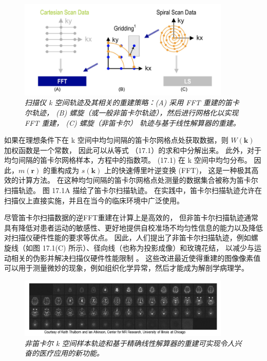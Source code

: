 \begin{figure}[H]
	\centering
	\includegraphics[width=0.9\textwidth]{figs/F17.1.png}
	\caption{\textit{扫描仪 k 空间轨迹及其相关的重建策略：(A) 采用 FFT 重建的笛卡尔轨迹，
	(B) 螺旋（或一般非笛卡尔轨迹），然后进行网格化以实现 FFT 重建，
	(C) 螺旋（非笛卡尔） 轨迹与基于线性解算器的重建。}}
\end{figure}

如果在理想条件下在 k 空间中均匀间隔的笛卡尔网格点处获取数据，则 $W(\mathbf{k})$ 加权函数是一个常数，
因此可以从等式 （17.1）的求和中分解出来。 此外，对于均匀间隔的笛卡尔网格样本，方程中的指数项。 
(17.1) 在 k 空间中均匀分布。 因此，$m(\mathbf{r})$ 的重构成为 $s(\mathbf{k})$ 上的快速傅里叶逆变换 (FFT)，
这是一种极其高效的计算方法。 在这种均匀间隔的笛卡尔网格点处测量的数据集合被称为笛卡尔扫描轨迹。 
图 17.1A 描绘了笛卡尔扫描轨迹。 在实践中，笛卡尔扫描轨迹允许在扫描仪上直接实施，并且在当今的临床环境中广泛使用。

尽管笛卡尔扫描数据的逆FFT重建在计算上是高效的，
但非笛卡尔扫描轨迹通常具有降低对患者运动的敏感性、更好地提供自校准场不均匀性信息的能力以及降低对扫描仪硬件性能的要求等优点。 
因此，人们提出了非笛卡尔扫描轨迹，例如螺旋线（如图 17.1(C) 所示）、径向线（也称为投影成像）和玫瑰花结，
以减少与运动相关的伪影并解决扫描仪硬件性能限制 。 
这些改进最近使得重建的图像像素值可以用于测量微妙的现象，例如组织化学异常，然后才能成为解剖学病理学。

\begin{figure}[H]
	\centering
	\includegraphics[width=0.9\textwidth]{figs/F17.2.png}
	\caption{\textit{非笛卡尔 k 空间样本轨迹和基于精确线性解算器的重建可实现令人兴奋的医疗应用的新功能。}}
\end{figure}


